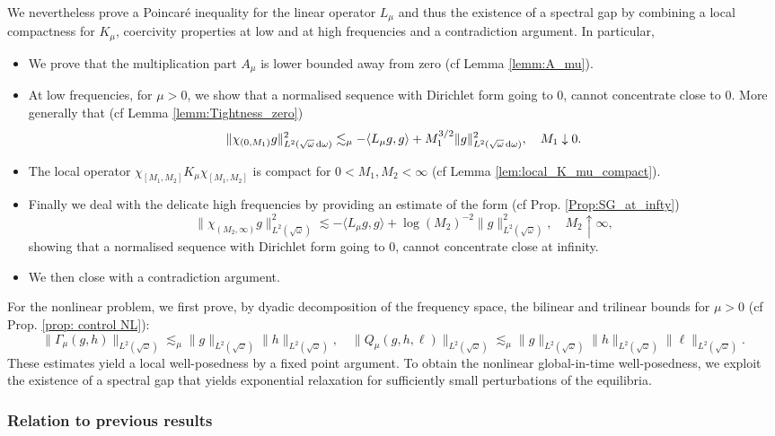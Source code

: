 \documentclass[reqno,11pt,letterpaper]{amsart}
\numberwithin{equation}{section}
\newcommand{\dd}{\, {\rm d}}
\begin{document}
We nevertheless prove a Poincaré inequality for the linear operator $L_\mu$ and thus the existence of a spectral gap by combining a local compactness for $K_\mu$, coercivity properties at low and at high frequencies and a contradiction argument. In particular,
\begin{itemize}
    \item We prove that the multiplication part $A_\mu$ is lower bounded away from zero (cf Lemma \ref{lemm:A_mu}). 
    \item At low frequencies, for $\mu>0$, we show that a normalised sequence with Dirichlet form going to $0$, cannot concentrate close to $0$. More generally that  (cf Lemma \ref{lemm:Tightness_zero})
    $$\|\chi_{(0,M_1)}g\|_{L^2(\sqrt{\omega}\dd\omega)}^2
\lesssim_\mu -\langle L_\mu g,g \rangle + M_1^{3/2}\|g\|_{L^2(\sqrt{\omega}\dd\omega)}^2,
 \quad M_1 \downarrow 0.
$$
    \item The local operator $\chi_{[M_1,M_2]}K_\mu\chi_{[M_1,M_2]} $ is compact for $0<M_1,M_2<\infty$ (cf Lemma \ref{lem:local_K_mu_compact}).
    \item Finally we deal with the delicate high frequencies by providing an estimate of the form (cf Prop. \ref{Prop:SG_at_infty}) $$ \|\chi_{(M_2, \infty)}g\|_{L^2(\sqrt{\omega})}^2 \lesssim -\langle L_\mu g,g \rangle + \log(M_2)^{-2} \|g\|_{L^2(\sqrt{\omega})}^2, \quad M_2 \uparrow \infty, $$
    showing that a normalised sequence with Dirichlet form going to $0$, cannot concentrate close at infinity. 
    \item We then close with a contradiction argument. 
\end{itemize}

For the nonlinear problem, we first prove, by dyadic decomposition of the frequency space, the bilinear and trilinear bounds for $\mu>0$ (cf Prop. \ref{prop: control NL}):
$$ \|\Gamma_\mu(g,h)\|_{L^2(\sqrt \omega )}
    \lesssim_\mu \|g\|_{L^2(\sqrt \omega)}\|h\|_{L^2(\sqrt \omega)}, \quad  \|Q_\mu(g,h,\ell)\|_{L^2(\sqrt \omega)}
    \lesssim_\mu
    \|g\|_{L^2(\sqrt \omega)}\|h\|_{L^2(\sqrt \omega)}\|\ell\|_{L^2(\sqrt \omega)}.
$$
These estimates yield a local well-posedness by a fixed point argument.  
To obtain the nonlinear global-in-time well-posedness, we exploit the existence of a spectral gap that yields  exponential relaxation for sufficiently small perturbations of the equilibria. 

\subsubsection{Relation to previous results}
\end{document}

